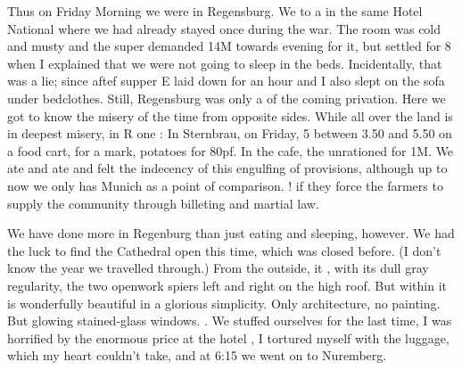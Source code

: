 \documentclass{article}
\begin{document}
\date{March 26, 1920}
Thus on Friday Morning we were in Regensburg. We  to a  in the same Hotel National where we had already stayed once during the war. The room was cold and musty and the super demanded 14M towards evening for it, but settled for 8 when I explained that we were not going to sleep in the beds. Incidentally, that was a lie; since aftef supper E laid down for an hour and I also slept on the sofa under bedclothes. Still, Regensburg was only a  of the coming privation. Here we got to know the misery of the time from opposite sides. While all over the land is in deepest misery, in R one : In Sternbrau, on  Friday, 5  between 3.50 and 5.50 on a food cart,  for a mark,  potatoes for 80pf. In the cafe, the  unrationed for 1M. We ate and ate and felt the indecency of this engulfing of provisions, although up to now we only has Munich as a point of comparison. !  if they  force the farmers to supply the community through billeting and martial law.

We have done more in Regenburg than just eating and sleeping, however. We had the luck to find the Cathedral open this time, which was closed before. (I don't know the year we travelled through.) From the outside, it , with its dull gray regularity, the two openwork spiers left and right on the high roof. But within it is wonderfully beautiful in a glorious  simplicity. Only architecture, no painting. But glowing stained-glass windows. .
We stuffed ourselves for the last time, I was horrified by the enormous price at the hotel , I tortured myself with the luggage, which my heart couldn't take, and at 6:15 we went on to Nuremberg.
\end{document}
